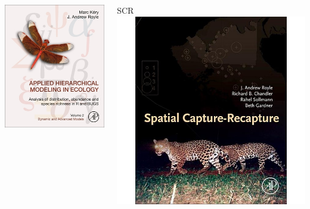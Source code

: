 \documentclass[color=usenames,dvipsnames]{beamer}\usepackage[]{graphicx}\usepackage[]{xcolor}
\begin{document}
\begin{frame}
\begin{columns}
\begin{column}{0.33\textwidth}
      \includegraphics[width=\textwidth]{figs/KeryRoyleBookCoverV2} \\
    \end{column}
    \begin{column}{0.33\textwidth}
      \centering
      SCR \\
      \includegraphics[width=\textwidth,trim=21mm 0mm 21mm 0mm,clip]{figs/SCRcover} \\

\end{column}
\end{columns}
\end{frame}
\end{document}
